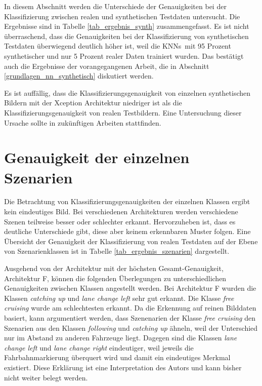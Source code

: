 In diesem Abschnitt werden die Unterschiede der Genauigkeiten bei der Klassifizierung zwischen realen und synthetischen Testdaten untersucht. Die Ergebnisse sind in Tabelle \ref{tab_ergebnis_synth} zusammengefasst. Es ist nicht überraschend, dass die Genauigkeiten bei der Klassifizierung von synthetischen Testdaten überwiegend deutlich höher ist, weil die \acp{KNN} mit 95 Prozent synthetischer und nur 5 Prozent realer Daten trainiert wurden. Das bestätigt auch die Ergebnisse der vorangegangenen Arbeit, die in Abschnitt \ref{grundlagen_nn_synthetisch} diskutiert werden. 

Es ist auffällig, dass die Klassifizierungsgenauigkeit von einzelnen synthetischen Bildern mit der Xception Architektur niedriger ist als die Klassifizierungsgenauigkeit von realen Testbildern. Eine Untersuchung dieser Ursache sollte in zukünftigen Arbeiten stattfinden.


\section{Genauigkeit der einzelnen Szenarien}
\label{ergebnis_szenarien}

Die Betrachtung von Klassifizierungsgenauigkeiten der einzelnen Klassen ergibt kein eindeutiges Bild. Bei verschiedenen Architekturen werden verschiedene Szenen teilweise besser oder schlechter erkannt. Hervorzuheben ist, dass es deutliche Unterschiede gibt, diese aber keinem erkennbaren Muster folgen. Eine Übersicht der Genauigkeit der Klassifizierung von realen Testdaten auf der Ebene von Szenarienklassen ist in Tabelle \ref{tab_ergebnis_szenarien} dargestellt.

Ausgehend von der Architektur mit der höchsten Gesamt-Genauigkeit, Architektur F, können die folgenden Überlegungen zu unterschiedlichen Genauigkeiten zwischen Klassen angestellt werden. Bei Architektur F wurden die Klassen \textit{catching up} und \textit{lane change left} sehr gut erkannt. Die Klasse \textit{free cruising} wurde am schlechtesten erkannt. Da die Erkennung auf reinen Bilddaten basiert, kann argumentiert werden, dass Szenenarien der Klasse \textit{free cruising} den Szenarien aus den Klassen \textit{following} und \textit{catching up} ähneln, weil der Unterschied nur im Abstand zu anderen Fahrzeuge liegt. Dagegen sind die Klassen \textit{lane change left} und \textit{lane change right} eindeutiger, weil jeweils die Fahrbahnmarkierung überquert wird und damit ein eindeutiges Merkmal existiert. Diese Erklärung ist eine Interpretation des Autors und kann bisher nicht weiter belegt werden.

